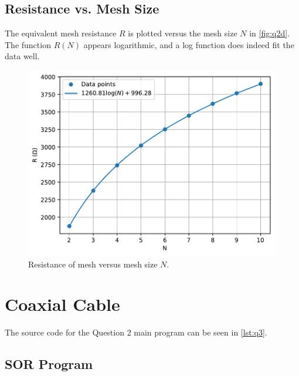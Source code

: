\documentclass[a4paper,titlepage]{article}
\begin{document}
	\subsection{Resistance vs. Mesh Size}
	
	The equivalent mesh resistance $R$ is plotted versus the mesh size $N$ in \autoref{fig:q2d}. The function $R(N)$ appears logarithmic, and a log function does indeed fit the data well.
	
	\begin{figure}[!htb]
		\centering
		\includegraphics[width=\columnwidth]{plots/q2d.pdf}
		\caption
		{Resistance of mesh versus mesh size $N$.}
		\label{fig:q2d}
	\end{figure}
	
	\section{Coaxial Cable}
	
	The source code for the Question 2 main program can be seen in \autoref{lst:q3}.
	
	\subsection{SOR Program}
	
\end{document}
